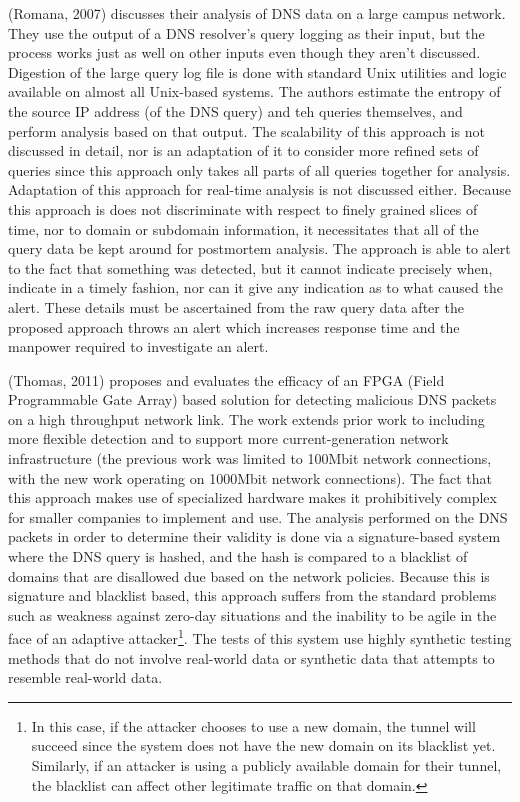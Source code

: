 \documentclass[12pt]{report}
\theoremstyle{remark}
\theoremstyle{definition}
\theoremstyle{definition}
\theoremstyle{definition}
\begin{document}
(Romana, 2007)\cite{Romana2007} discusses their analysis of DNS data on a large
campus network. They use the output of a DNS resolver's query logging as their
input, but the process works just as well on other inputs even though they
aren't discussed. Digestion of the large query log file is done with standard
Unix utilities and logic available on almost all Unix-based systems. The authors
estimate the entropy of the source IP address (of the DNS query) and teh queries
themselves, and perform analysis based on that output. The scalability of this
approach is not discussed in detail, nor is an adaptation of it to consider more
refined sets of queries since this approach only takes all parts of all queries
together for analysis. Adaptation of this approach for real-time analysis is not
discussed either. Because this approach is does not discriminate with respect to
finely grained slices of time, nor to domain or subdomain information, it
necessitates that all of the query data be kept around for postmortem analysis.
The approach is able to alert to the fact that something was detected, but it
cannot indicate precisely when, indicate in a timely fashion, nor can it give
any indication as to what caused the alert. These details must be ascertained
from the raw query data after the proposed approach throws an alert which
increases response time and the manpower required to investigate an alert.

(Thomas, 2011)\cite{Thomas2011} proposes and evaluates the efficacy of an FPGA
(Field Programmable Gate Array) based solution for detecting malicious DNS
packets on a high throughput network link. The work extends prior work to
including more flexible detection and to support more current-generation network
infrastructure (the previous work was limited to 100Mbit network connections,
with the new work operating on 1000Mbit network connections). The fact that this
approach makes use of specialized hardware makes it prohibitively complex for
smaller companies to implement and use. The analysis performed on the DNS
packets in order to determine their validity is done via a signature-based system
where the DNS query is hashed, and the hash is compared to a blacklist of
domains that are disallowed due based on the network policies. Because this is
signature and blacklist based, this approach suffers from the standard problems
such as weakness against zero-day situations and the inability to be agile in
the face of an adaptive attacker\footnote{In this case, if the attacker chooses
to use a new domain, the tunnel will succeed since the system does not have the
new domain on its blacklist yet. Similarly, if an attacker is using a publicly
available domain for their tunnel, the blacklist can affect other legitimate
traffic on that domain.}. The tests of this system use highly synthetic testing
methods that do not involve real-world data or synthetic data that attempts to
resemble real-world data.
\end{document}
